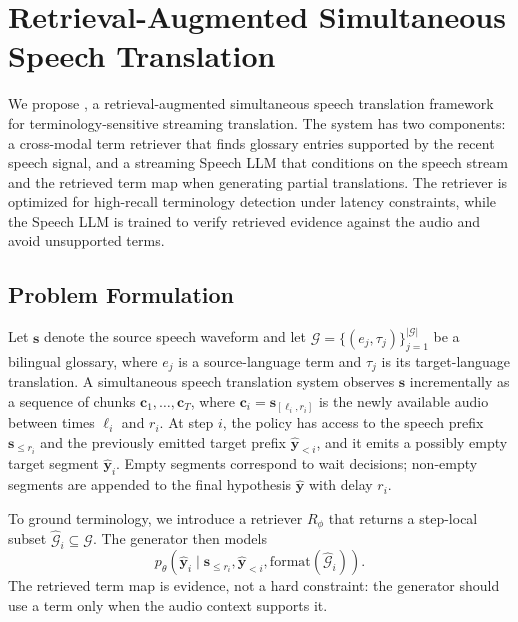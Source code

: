 \section{Retrieval-Augmented Simultaneous Speech Translation}
\label{sec:method}

We propose \method, a retrieval-augmented simultaneous speech translation framework for terminology-sensitive streaming translation. The system has two components: a cross-modal term retriever that finds glossary entries supported by the recent speech signal, and a streaming Speech LLM that conditions on the speech stream and the retrieved term map when generating partial translations. The retriever is optimized for high-recall terminology detection under latency constraints, while the Speech LLM is trained to verify retrieved evidence against the audio and avoid unsupported terms.

\subsection{Problem Formulation}
\label{sec:problem_formulation}

Let $\mathbf{s}$ denote the source speech waveform and let $\mathcal{G}=\{(e_j,\tau_j)\}_{j=1}^{|\mathcal{G}|}$ be a bilingual glossary, where $e_j$ is a source-language term and $\tau_j$ is its target-language translation. A simultaneous speech translation system observes $\mathbf{s}$ incrementally as a sequence of chunks $\mathbf{c}_1,\ldots,\mathbf{c}_T$, where $\mathbf{c}_i=\mathbf{s}_{[\ell_i,r_i]}$ is the newly available audio between times $\ell_i$ and $r_i$. At step $i$, the policy has access to the speech prefix $\mathbf{s}_{\le r_i}$ and the previously emitted target prefix $\hat{\mathbf{y}}_{<i}$, and it emits a possibly empty target segment $\hat{\mathbf{y}}_i$. Empty segments correspond to wait decisions; non-empty segments are appended to the final hypothesis $\hat{\mathbf{y}}$ with delay $r_i$.

To ground terminology, we introduce a retriever $R_\phi$ that returns a step-local subset $\hat{\mathcal{G}}_i\subseteq\mathcal{G}$. The generator then models
\begin{equation}
  p_\theta(\hat{\mathbf{y}}_i \mid
    \mathbf{s}_{\le r_i},
    \hat{\mathbf{y}}_{<i},
    \mathrm{format}(\hat{\mathcal{G}}_i)).
\end{equation}
The retrieved term map is evidence, not a hard constraint: the generator should use a term only when the audio context supports it.

